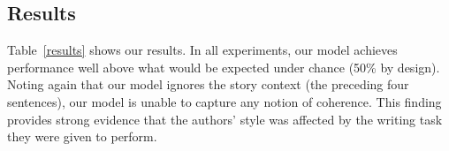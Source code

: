 \documentclass[11pt,a4paper]{article}
\newcommand{\figref}[1]{Figure~\ref{#1}}
\newcommand{\tabref}[1]{Table~\ref{#1}}
\newcommand{\isubsectionb}[1]{\subsection{#1}\label{ssec:#1}}
\newcommand{\com}[1]{}
\newcommand{\resolved}[1]{}
\newcommand{\yc}[1]{{\color{bblue}\{\textit{#1}\}$_{yc}$}}
\newcommand{\nascomment}[1]{{\color{blue}\textsc{[#1 --nas]}}}
\newcommand{\clinic}[1]{{\color{magenta}\textsc{[#1 --CLINIC]}}}
\renewcommand{\nascomment}[1]{}
\renewcommand{\yc}[1]{}
\begin{document}
\isubsectionb{Results}
\tabref{results} shows our results.  In all experiments,
our model achieves performance well above what would be expected under
chance (50\% by design).  Noting again that our model ignores the
story context (the preceding four sentences), our model is unable to
capture any notion of coherence.   This finding provides
strong evidence that the authors' style was affected by the writing task they
were given to perform.\com{ On our third task, which compared 
\emph{original} vs.~\emph{wrong (new)} endings, even stronger
differences were apparent to the model, allowing over 75\% accuracy.}


\resolved{\nascomment{I rewrote this section.  old version commented out in
  latex source}}

\end{document}
